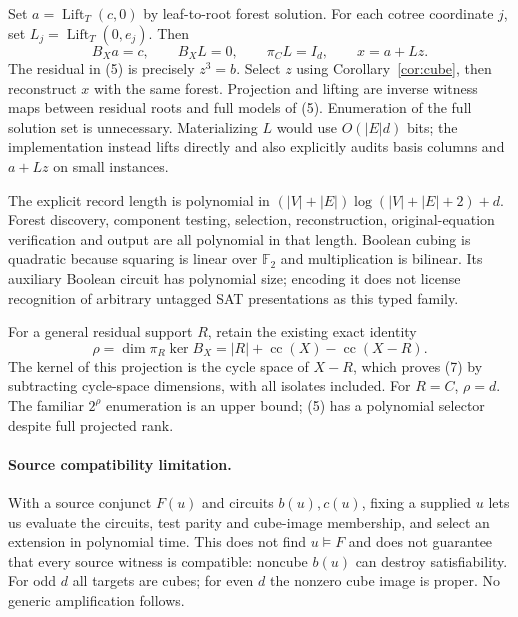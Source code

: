 \documentclass[11pt]{article}
\newcommand{\F}{\mathbb F}
\begin{document}
Set $a=\operatorname{Lift}_T(c,0)$ by leaf-to-root forest solution. For each
cotree coordinate $j$, set $L_j=\operatorname{Lift}_T(0,e_j)$. Then
\[
 B_Xa=c,\qquad B_XL=0,\qquad \pi_CL=I_d,
 \qquad x=a+Lz.                                       \tag{6}
\]
The residual in (5) is precisely $z^3=b$. Select $z$ using
Corollary~\ref{cor:cube}, then reconstruct $x$ with the same forest. Projection
and lifting are inverse witness maps between residual roots and full models
of (5). Enumeration of the full solution set is unnecessary. Materializing
$L$ would use $O(|E|d)$ bits; the implementation instead lifts directly and
also explicitly audits basis columns and $a+Lz$ on small instances.

The explicit record length is polynomial in
$(|V|+|E|)\log(|V|+|E|+2)+d$. Forest discovery, component testing, selection,
reconstruction, original-equation verification and output are all polynomial
in that length. Boolean cubing is quadratic because squaring is linear over
$\F_2$ and multiplication is bilinear. Its auxiliary Boolean circuit has
polynomial size; encoding it does not license recognition of arbitrary
untagged SAT presentations as this typed family.

For a general residual support $R$, retain the existing exact identity
\[
 \rho=\dim\pi_R\ker B_X
       =|R|+\operatorname{cc}(X)-\operatorname{cc}(X-R). \tag{7}
\]
The kernel of this projection is the cycle space of $X-R$, which proves
(7) by subtracting cycle-space dimensions, with all isolates included.
For $R=C$, $\rho=d$. The familiar $2^\rho$ enumeration is an upper bound;
(5) has a polynomial selector despite full projected rank.

\paragraph{Source compatibility limitation.}
With a source conjunct $F(u)$ and circuits $b(u),c(u)$, fixing a supplied
$u$ lets us evaluate the circuits, test parity and cube-image membership,
and select an extension in polynomial time. This does not find $u\models F$
and does not guarantee that every source witness is compatible: noncube
$b(u)$ can destroy satisfiability. For odd $d$ all targets are cubes; for even
$d$ the nonzero cube image is proper. No generic amplification follows.
\end{document}
